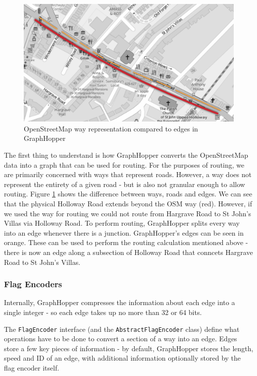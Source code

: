 \documentclass[ %
                    author={Alexander Hill},
                supervisor={Dr. Benjamin Sach},
                    degree={MEng},
                     title={MARMOSET},
                  subtitle={Multi-Agent Route Management using Online Simulation for Efficient Transportation},
                      type={research},
                      year={2016} ]{dissertation}
\begin{document}
\begin{figure}[p]
    \centering
    \includegraphics[scale=0.6]{osm-gh}
    \caption{OpenStreetMap way representation compared to edges in GraphHopper}\label{fig:osm-gh}
\end{figure}

The first thing to understand is how GraphHopper converts the OpenStreetMap data
into a graph that can be used for routing.  For the purposes of routing, we are
primarily concerned with ways that represent roads. However, a way does not
represent the entirety of a given road - but is also not granular enough to
allow routing. Figure \ref{fig:osm-gh} shows the difference between ways, roads
and edges. We can see that the physical Holloway Road extends beyond the OSM way
(red). However, if we used the way for routing we could not route from Hargrave
Road to St John's Villas via Holloway Road. To perform routing, GraphHopper
splits every way into an edge whenever there is a junction. GraphHopper's edges
can be seen in orange. These can be used to perform the routing calculation
mentioned above - there is now an edge along a subsection of Holloway Road that
conncets Hargrave Road to St John's Villas.

\subsubsection{Flag Encoders}

Internally, GraphHopper compresses the information about each edge into a single
integer - so each edge takes up no more than 32 or 64 bits.

The \texttt{FlagEncoder} interface (and the \texttt{AbstractFlagEncoder} class)
define what operations have to be done to convert a section of a way into an
edge. Edges store a few key pieces of information - by default, GraphHopper
stores the length, speed and ID of an edge, with additional information
optionally stored by the flag encoder itself.
\end{document}
